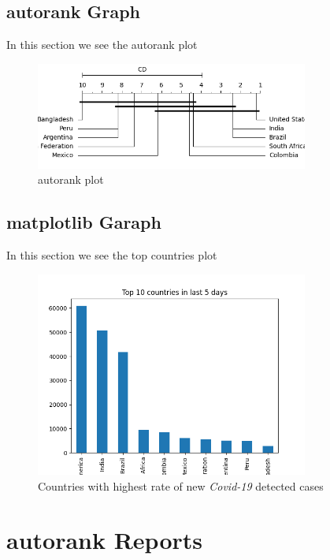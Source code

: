 \documentclass[12pt, letterpaper, twoside]{report}
\begin{document}
\section{autorank Graph}
In this section we see the autorank plot
\begin{figure}[h]
    \centering
    \includegraphics[width=0.8\textwidth]{autorank.png}
    \caption{autorank plot}
    \label{fig:autorank}
\end{figure} 

\section{matplotlib Garaph}
 In this section we see the top countries plot
\begin{figure}[h]
    \centering
    \includegraphics[width=0.8\textwidth]{TopCountries.png}
    \caption{Countries with highest rate of new \textit{Covid-19} detected cases}
    \label{fig:TopCountries}
\end{figure}
\chapter{autorank Reports}
 
 
 \begin{abstract}
  autorank is a simple Python package with one task: simplify the comparison between (multiple) paired populations. This is, for example, required if the performance different machine learning algorithms or simulations should be compared on multiple data sets. The performance measures on each data set are then the paired samples, the difference in the central tendency (e.g., the mean or median) can be used to rank the different algorithms. In \ref{fig:autorank} you can see one output sample of this library
 \end{abstract}
 
\end{document}
